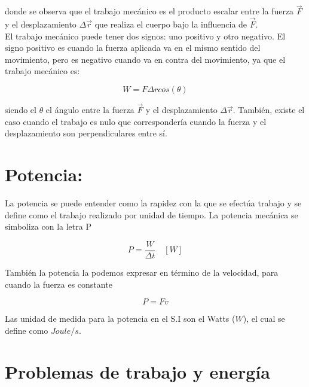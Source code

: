 donde se observa que el trabajo mecánico es el producto escalar entre la fuerza $\vec{F}$ y el desplazamiento $\Delta \vec{r}$ 
que 
realiza el cuerpo bajo la influencia de $\vec{F}$.\\

El trabajo mecánico puede tener dos signos: uno positivo y otro negativo. El signo positivo es cuando la fuerza aplicada va en el 
mismo sentido del movimiento, pero es negativo cuando va en contra del movimiento, ya que el trabajo mecánico es:

\begin{equation}
W = F\Delta r cos(\theta)
\end{equation}
 
siendo el $\theta$ el ángulo entre la fuerza $\vec{F}$ y el desplazamiento $\Delta \vec{r}$. También, existe el caso cuando el 
trabajo es nulo que correspondería cuando la fuerza y el desplazamiento son perpendiculares entre sí.
  
\section{Potencia:}  

La potencia se puede entender como la rapidez con la que se efectúa trabajo y se define como el trabajo realizado por unidad de 
tiempo. La potencia mecánica se simboliza con la letra P

\begin{equation}
P = \frac{W}{\Delta t}\quad [W]
\end{equation}

También la potencia la podemos expresar en término de la velocidad, para cuando la fuerza es constante

\begin{equation}
P = Fv
\end{equation}

Las unidad de medida para la potencia en el S.I son el Watts ($W$), el cual se define como $Joule/s$.

\section{Problemas de trabajo y energía}


